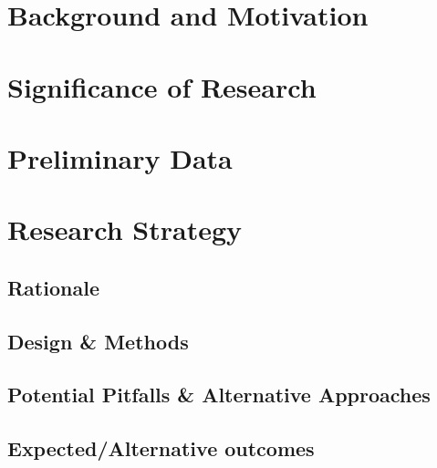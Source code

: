 \documentclass[11pt]{article}
\begin{document}
\newpage

\section*{Background and Motivation}



\section*{Significance of Research}

\section*{Preliminary Data}

\section*{Research Strategy}

\subsection*{Rationale}

\subsection*{Design \& Methods}

\subsection*{Potential Pitfalls \& Alternative Approaches}

\subsection*{Expected/Alternative outcomes}

 

\end{document}
